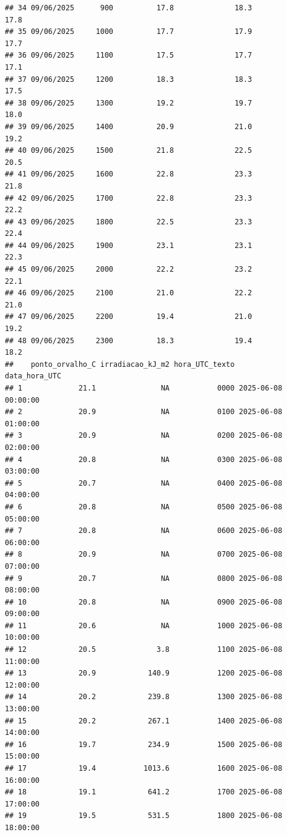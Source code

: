 \documentclass[
]{article}
\begin{document}
\begin{verbatim}
## 34 09/06/2025      900          17.8              18.3              17.8
## 35 09/06/2025     1000          17.7              17.9              17.7
## 36 09/06/2025     1100          17.5              17.7              17.1
## 37 09/06/2025     1200          18.3              18.3              17.5
## 38 09/06/2025     1300          19.2              19.7              18.0
## 39 09/06/2025     1400          20.9              21.0              19.2
## 40 09/06/2025     1500          21.8              22.5              20.5
## 41 09/06/2025     1600          22.8              23.3              21.8
## 42 09/06/2025     1700          22.8              23.3              22.2
## 43 09/06/2025     1800          22.5              23.3              22.4
## 44 09/06/2025     1900          23.1              23.1              22.3
## 45 09/06/2025     2000          22.2              23.2              22.1
## 46 09/06/2025     2100          21.0              22.2              21.0
## 47 09/06/2025     2200          19.4              21.0              19.2
## 48 09/06/2025     2300          18.3              19.4              18.2
##    ponto_orvalho_C irradiacao_kJ_m2 hora_UTC_texto       data_hora_UTC
## 1             21.1               NA           0000 2025-06-08 00:00:00
## 2             20.9               NA           0100 2025-06-08 01:00:00
## 3             20.9               NA           0200 2025-06-08 02:00:00
## 4             20.8               NA           0300 2025-06-08 03:00:00
## 5             20.7               NA           0400 2025-06-08 04:00:00
## 6             20.8               NA           0500 2025-06-08 05:00:00
## 7             20.8               NA           0600 2025-06-08 06:00:00
## 8             20.9               NA           0700 2025-06-08 07:00:00
## 9             20.7               NA           0800 2025-06-08 08:00:00
## 10            20.8               NA           0900 2025-06-08 09:00:00
## 11            20.6               NA           1000 2025-06-08 10:00:00
## 12            20.5              3.8           1100 2025-06-08 11:00:00
## 13            20.9            140.9           1200 2025-06-08 12:00:00
## 14            20.2            239.8           1300 2025-06-08 13:00:00
## 15            20.2            267.1           1400 2025-06-08 14:00:00
## 16            19.7            234.9           1500 2025-06-08 15:00:00
## 17            19.4           1013.6           1600 2025-06-08 16:00:00
## 18            19.1            641.2           1700 2025-06-08 17:00:00
## 19            19.5            531.5           1800 2025-06-08 18:00:00

\end{verbatim}
\end{document}
